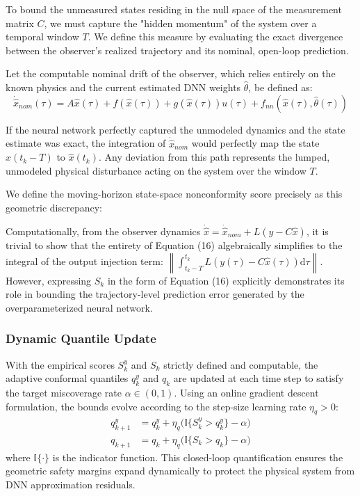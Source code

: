 \documentclass[letterpaper, 10 pt, conference]{ieeeconf}  %
\begin{document}
To bound the unmeasured states residing in the null space of the measurement matrix $C$, we must capture the "hidden momentum" of the system over a temporal window $T$. We define this measure by evaluating the exact divergence between the observer's realized trajectory and its nominal, open-loop prediction.

Let the computable nominal drift of the observer, which relies entirely on the known physics and the current estimated DNN weights $\hat{\theta}$, be defined as:
\begin{equation}
    \dot{\hat{x}}_{nom}(\tau) = A\hat{x}(\tau) + f(\hat{x}(\tau)) + g(\hat{x}(\tau))u(\tau) + f_{nn}(\hat{x}(\tau), \hat{\theta}(\tau))
\end{equation}

If the neural network perfectly captured the unmodeled dynamics and the state estimate was exact, the integration of $\dot{\hat{x}}_{nom}$ would perfectly map the state $\hat{x}(t_k-T)$ to $\hat{x}(t_k)$. Any deviation from this path represents the lumped, unmodeled physical disturbance acting on the system over the window $T$. 

We define the moving-horizon state-space nonconformity score precisely as this geometric discrepancy:

Computationally, from the observer dynamics $\dot{\hat{x}} = \dot{\hat{x}}_{nom} + L(y - C\hat{x})$, it is trivial to show that the entirety of Equation (16) algebraically simplifies to the integral of the output injection term: $\left\| \int_{t_k-T}^{t_k} L(y(\tau) - C\hat{x}(\tau)) \mathrm{d}\tau \right\|$. However, expressing $S_k$ in the form of Equation (16) explicitly demonstrates its role in bounding the trajectory-level prediction error generated by the overparameterized neural network.



\subsubsection{Dynamic Quantile Update}

With the empirical scores $S^y_k$ and $S_k$ strictly defined and computable, the adaptive conformal quantiles $q^y_k$ and $q_k$ are updated at each time step to satisfy the target miscoverage rate $\alpha \in (0,1)$. Using an online gradient descent formulation, the bounds evolve according to the step-size learning rate $\eta_q > 0$:
\begin{align}
    q^y_{k+1} &= q^y_k + \eta_q \Big( \mathbb{I} \{ S^y_k > q^y_k \} -\alpha\Big) \\
    q_{k+1} &= q_k + \eta_q \Big(\mathbb{I} \{ S_k > q_k \} -\alpha \Big)
\end{align}
where $\mathbb{I}\{\cdot\}$ is the indicator function. This closed-loop quantification ensures the geometric safety margins expand dynamically to protect the physical system from DNN approximation residuals.
\end{document}
